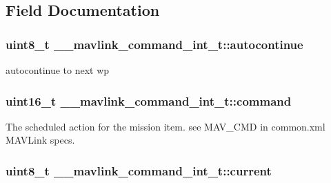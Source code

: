 \subsection{Field Documentation}
\hypertarget{struct____mavlink__command__int__t_a4ff5413c110651ecc428a47001d55d77}{
\subsubsection[{autocontinue}]{\setlength{\rightskip}{0pt plus 5cm}uint8\+\_\+t \+\_\+\+\_\+mavlink\+\_\+command\+\_\+int\+\_\+t\+::autocontinue}}\label{struct____mavlink__command__int__t_a4ff5413c110651ecc428a47001d55d77}


autocontinue to next wp 

\hypertarget{struct____mavlink__command__int__t_a210e8661b405ea012003058debdd98ed}{
\subsubsection[{command}]{\setlength{\rightskip}{0pt plus 5cm}uint16\+\_\+t \+\_\+\+\_\+mavlink\+\_\+command\+\_\+int\+\_\+t\+::command}}\label{struct____mavlink__command__int__t_a210e8661b405ea012003058debdd98ed}


The scheduled action for the mission item. see M\+A\+V\+\_\+\+C\+M\+D in common.\+xml M\+A\+V\+Link specs. 

\hypertarget{struct____mavlink__command__int__t_aa4f61af5513c289bdf1c0eeeb4f5d64d}{
\subsubsection[{current}]{\setlength{\rightskip}{0pt plus 5cm}uint8\+\_\+t \+\_\+\+\_\+mavlink\+\_\+command\+\_\+int\+\_\+t\+::current}}\label{struct____mavlink__command__int__t_aa4f61af5513c289bdf1c0eeeb4f5d64d}


